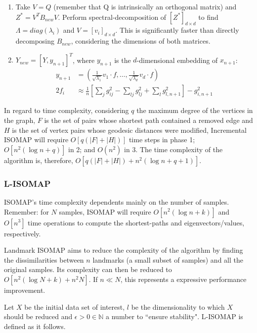 \documentclass[12pt]{report}
\begin{document}
\begin{enumerate}
\begin{enumerate}
		\item Take $V=Q$ (remember that Q is intrinsically an orthogonal matrix) and $Z^*=V^TB_{new}V$. Perform spectral-decomposition of $[Z^*]_{d \times d}$ to find $\Lambda = diag(\lambda_i)$ and $V = [v_i]_{d \times d}$. This is significantly faster than directly decomposing $B_{new}$, considering the dimensions of both matrices. 

		\item $Y_{new} = [Y, y_{n+1}]^T$, where $y_{n+1}$ is the $d$-dimensional embedding of $x_{n+1}$:
		\begin{align*}
			y_{n+1} &= (\frac{1}{\sqrt{\lambda_1}} v_1 \cdot f, \dots, \frac{1}{\sqrt{\lambda_d}} v_d \cdot f) \\
			2f_i &\approx \frac{1}{n}[\sum_j g_{ij}^2 - \sum_{lj} g_{lj}^2 + \sum_l g_{l, n+1}^2] -g_{i, n+1}^2
		\end{align*}
	\end{enumerate}
\end{enumerate}

In regard to time complexity, considering $q$ the maximum degree of the vertices in the graph, $F$ is the set of pairs whose shortest path contained a removed edge and $H$ is the set of vertex pairs whose geodesic distances were modified, Incremental ISOMAP will require $O[q(|F|+|H|)]$ time steps in phase 1; $O[n^2(\log n + q)]$ in 2; and $O(n^2)$ in 3. The time complexity of the algorithm is, therefore, $O[q(|F|+|H|) + n^2(\log n + q + 1)]$.

\subsubsection{L-ISOMAP}
\label{sec:lisomap}

ISOMAP's time complexity dependents mainly on the number of samples. Remember: for $N$ samples, ISOMAP will require $O[n^2(\log n + k)]$ and $O[n^3]$ time operations to compute the shortest-paths and eigenvectors/values, respectively.

Landmark ISOMAP aims to reduce the complexity of the algorithm by finding the dissimilarities between $n$ landmarks (a small subset of samples) and all the original samples. Its complexity can then be reduced to $O[n^2(\log N + k) + n^2N]$. If $n \ll N$, this represents a expressive performance improvement. \cite{silva2002global}

Let $X$ be the initial data set of interest, $l$ be the dimensionality to which $X$ should be reduced and $\epsilon > 0 \in \mathbb{N}$ a number to ``ensure stability". \cite{silva2002global} L-ISOMAP is defined as it follows.
\end{document}
